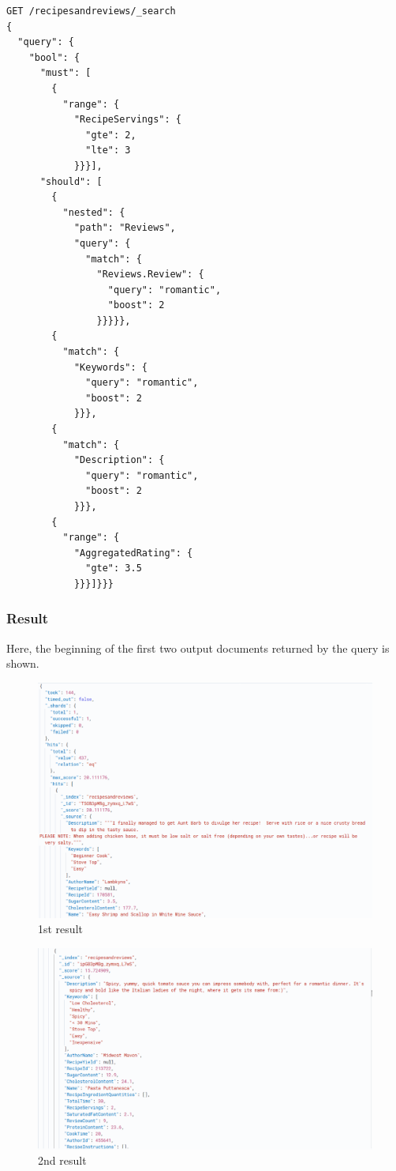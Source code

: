 \begin{enumerate}
\begin{lstlisting}[language=Elasticsearch]
GET /recipesandreviews/_search
{
  "query": {
    "bool": {
      "must": [
        {
          "range": {
            "RecipeServings": {
              "gte": 2,
              "lte": 3
            }}}],
      "should": [
        {
          "nested": {
            "path": "Reviews",
            "query": {
              "match": {
                "Reviews.Review": {
                  "query": "romantic",
                  "boost": 2
                }}}}},
        {
          "match": {
            "Keywords": {
              "query": "romantic",
              "boost": 2
            }}},
        {
          "match": {
            "Description": {
              "query": "romantic",
              "boost": 2
            }}},
        {
          "range": {
            "AggregatedRating": {
              "gte": 3.5
            }}}]}}}

    \end{lstlisting}
    \subsubsection{Result}
    Here, the beginning of the first two output documents returned by the query is shown.
    \begin{figure}[H]
    \centering
    \includegraphics[width=0.8\linewidth]{Report/ReportLatex/Images/ElasticsearchResults/RomanticDinner1.png}
    \caption{1st result}
    \label{fig:enter-label}
    \end{figure}
    \begin{figure}[H]
    \centering
    \includegraphics[width=0.9\linewidth]{Report/ReportLatex/Images/ElasticsearchResults/RomanticDinner2.png}
    \caption{2nd result}
    \label{fig:enter-label}
    \end{figure}
    \clearpage
    

\end{enumerate}
